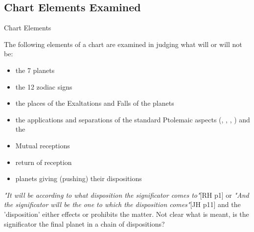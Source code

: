 \subsection{Chart Elements Examined}
\begin{frame}[t]{Chart Elements}

The following elements of a chart are examined in judging what will or will not be:
\begin{itemize}
\item the 7 planets
\item the 12 zodiac signs
\item the places of  the Exaltations and Falls of the planets
\item the applications and separations of the standard Ptolemaic aspects (\Sextile, \Square, \Trine, \Opposition) and the \Conjunction
\item Mutual receptions
\item return of reception
\item planets giving (pushing) their dispositions
\end{itemize}

\textsl{"It will be according to what disposition the significator comes to"}[RH p1] or \textsl{"And the significator will be the one to which the disposition comes"}[JH p11] and the 'disposition' either effects or prohibits the matter. {\color{red} Not clear what is meant, is the significator the final planet in a chain of dispositions?}
\end{frame}
